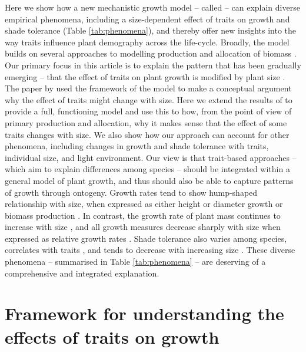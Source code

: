 \documentclass[a4paper,11pt]{article}
\begin{document}
Here we show how a new mechanistic growth model -- called {\plant} \citep{Falster-2016} -- can explain diverse empirical phenomena, including a size-dependent effect of traits on growth and shade tolerance (Table \ref{tab:phenomena}), and thereby offer new insights into the way traits influence plant demography across the life-cycle. Broadly, the {\plant} model builds on several approaches to modelling production and allocation of biomass \citep[e.g.][]{Givnish-1988, Yokozawa-1995,Makela-1997, Moorcroft-2001, Sitch-2008, Falster-2011, King-2011}. Our primary focus in this article is to explain the pattern that has been gradually emerging -- that the effect of traits on plant growth is modified by plant size \citep{Ruger-2012, Iida-2014, Gibert-2016}. The paper by \citet{Gibert-2016} used the framework of the {\plant} model to make a conceptual argument why the effect of traits might change with size. Here we extend the results of \citet{Gibert-2016} to provide a full, functioning model and use this to how, from the point of view of primary production and allocation, why it makes sense that the effect of some traits changes with size. We also show how our approach can account for other phenomena, including changes in growth and shade tolerance with traits, individual size, and light environment. Our view is that trait-based approaches -- which aim to explain differences among species -- should be integrated within a general model of plant growth, and thus should also be able to capture patterns of growth through ontogeny. Growth rates tend to show hump-shaped relationship with size, when expressed as either height \citep{Sillett-2010, King-2011} or diameter growth \citep{Herault-2011} or biomass production \citep{Givnish-1988, Koch-2004}. In contrast, the growth rate of plant mass continues to increase with size \citep{Sillett-2010, Stephenson-2014}, and all growth measures decrease sharply with size when expressed as relative growth rates \citep{Rees-2010, Iida-2014}. Shade tolerance also varies among species, correlates with traits \citep{Messier-1999, Lusk-2008, Poorter-2006}, and tends to decrease with increasing size \citep{Givnish-1988, Kneeshaw-2006, Lusk-2008}. These diverse phenomena -- summarised in Table \ref{tab:phenomena} -- are deserving of a comprehensive and integrated explanation.

\section{Framework for understanding the effects of traits on growth}
\end{document}
